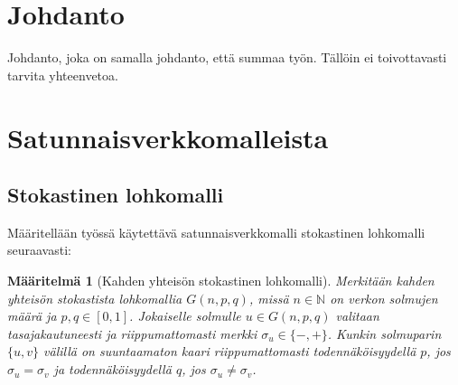 \documentclass[finnish,12pt,a4paper,pdftex,sci,utf8]{aaltothesis}
\newtheorem{definition}{Määritelmä}
\begin{document}

%
%
%

\newpage


\thesistableofcontents


\cleardoublepage
\storeinipagenumber
{}
\setcounter{page}{1}


\section{Johdanto}
Johdanto, joka on samalla johdanto, että summaa työn. Tällöin ei toivottavasti tarvita yhteenvetoa.
\thispagestyle{empty}

\clearpage

\section{Satunnaisverkkomalleista}

\subsection{Stokastinen lohkomalli}
Määritellään työssä käytettävä satunnaisverkkomalli stokastinen lohkomalli seuraavasti:

\begin{definition}[Kahden yhteisön stokastinen lohkomalli]
	Merkitään kahden yhteisön stokastista lohkomallia $G(n,p,q)$, missä $n \in \mathbb{N}$ on verkon solmujen määrä ja $p,q \in [0,1]$.  Jokaiselle solmulle $u \in G(n,p,q)$ valitaan tasajakautuneesti ja riippumattomasti merkki $\sigma_u \in \{-, +\}$. Kunkin solmuparin $\{u,v\}$ välillä on suuntaamaton kaari riippumattomasti todennäköisyydellä $p$, jos $\sigma_u = \sigma_v$ ja todennäköisyydellä $q$, jos $\sigma_u \neq \sigma_v$.
\end{definition}
\end{document}
